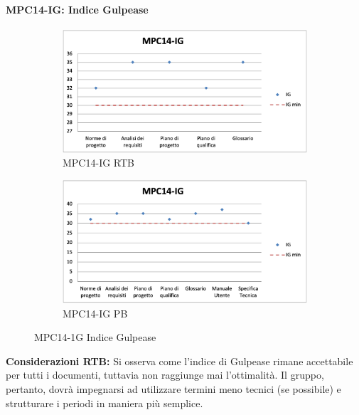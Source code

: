 \paragraph{MPC14-IG: Indice Gulpease}
\begin{figure}[h!]
    \centering
    \begin{subfigure}[b]{0.49\textwidth}
        \centering
        \includegraphics[width=\textwidth]{images/MPC14-EODrtb.png}
        \caption{MPC14-IG RTB}
        \label{fig:image1}
    \end{subfigure}
    \hfill
    \begin{subfigure}[b]{0.49\textwidth}
        \centering
        \includegraphics[width=\textwidth]{images/MPC14-IG.png}
        \caption{MPC14-IG PB}
        \label{fig:image2}
    \end{subfigure}
    \caption{MPC14-1G Indice Gulpease}
    \label{fig:whole_figure}
\end{figure}

\noindent \textbf{Considerazioni RTB:} Si osserva come l'indice di Gulpease rimane accettabile per tutti i documenti, tuttavia non raggiunge mai l'ottimalità. Il gruppo, pertanto, dovrà impegnarsi ad utilizzare termini meno tecnici (se possibile) e strutturare i periodi in maniera più semplice.


